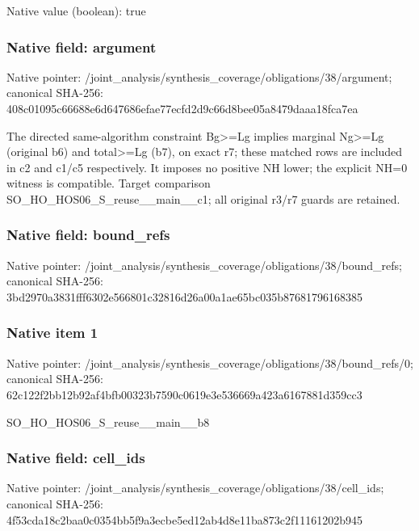 \documentclass[10pt,a4paper]{article}
\begin{document}
Native value (boolean): true

\subsubsection{Native field: argument}
Native pointer: /joint\_\allowbreak{}analysis/synthesis\_\allowbreak{}coverage/obligations/38/argument; canonical SHA-256: 408c01095c66688e6d647686efae77ecfd2d9c66d8bee05a8479daaa18fca7ea

\begingroup\raggedright\sloppy The directed same-algorithm constraint Bg>=\allowbreak{}Lg implies marginal Ng>=\allowbreak{}Lg (original b6) and total>=\allowbreak{}Lg (b7),\allowbreak{} on exact r7;\allowbreak{} these matched rows are included in c2 and c1/\allowbreak{}c5 respectively. It imposes no positive NH lower;\allowbreak{} the explicit NH=\allowbreak{}0 witness is compatible. Target comparison SO\_\allowbreak{}HO\_\allowbreak{}HOS06\_\allowbreak{}S\_\allowbreak{}reuse\_\allowbreak{}\_\allowbreak{}main\_\allowbreak{}\_\allowbreak{}c1;\allowbreak{} all original r3/\allowbreak{}r7 guards are retained.\par\endgroup

\subsubsection{Native field: bound\_\allowbreak{}refs}
Native pointer: /joint\_\allowbreak{}analysis/synthesis\_\allowbreak{}coverage/obligations/38/bound\_\allowbreak{}refs; canonical SHA-256: 3bd2970a3831fff6302e566801c32816d26a00a1ae65bc035b87681796168385

\subsubsection{Native item 1}
Native pointer: /joint\_\allowbreak{}analysis/synthesis\_\allowbreak{}coverage/obligations/38/bound\_\allowbreak{}refs/0; canonical SHA-256: 62c122f2bb12b92af4bfb00323b7590c0619e3e536669a423a6167881d359cc3

\begingroup\raggedright\sloppy SO\_\allowbreak{}HO\_\allowbreak{}HOS06\_\allowbreak{}S\_\allowbreak{}reuse\_\allowbreak{}\_\allowbreak{}main\_\allowbreak{}\_\allowbreak{}b8\par\endgroup

\subsubsection{Native field: cell\_\allowbreak{}ids}
Native pointer: /joint\_\allowbreak{}analysis/synthesis\_\allowbreak{}coverage/obligations/38/cell\_\allowbreak{}ids; canonical SHA-256: 4f53cda18c2baa0c0354bb5f9a3ecbe5ed12ab4d8e11ba873c2f11161202b945
\end{document}
